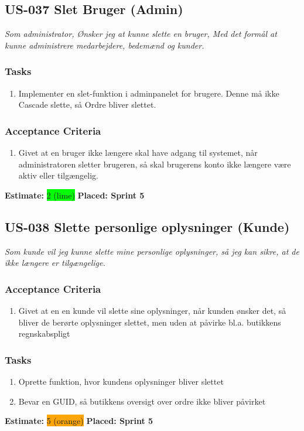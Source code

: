 \subsection{US-037 Slet Bruger (Admin)}
\label{sec:US-037}
\textit{Som administrator, Ønsker jeg at kunne slette en bruger, Med det formål at kunne administrere medarbejdere, bedemænd og kunder.}
\subsubsection*{\textbf{Tasks}}
\begin{enumerate}
  \item Implementer en slet-funktion i adminpanelet for brugere. Denne må ikke Cascade slette, så Ordre bliver slettet.
\end{enumerate}
\subsubsection*{\textbf{Acceptance Criteria}}
\begin{enumerate}
  \item Givet at en bruger ikke længere skal have adgang til systemet, når administratoren sletter brugeren, så skal brugerens konto ikke længere være aktiv eller tilgængelig.
\end{enumerate}
\textbf{Estimate:} \colorbox{lime}{2 (lime)}
\textbf{Placed: Sprint 5}
\par\noindent\dotfill

\subsection{US-038 Slette personlige oplysninger (Kunde)}
\label{sec:US-038}
\textit{Som kunde vil jeg kunne slette mine personlige oplysninger, så jeg kan sikre, at de ikke længere er tilgængelige.}
\subsubsection*{\textbf{Acceptance Criteria}}
\begin{enumerate}
  \item Givet at en en kunde vil slette sine oplysninger, når kunden ønsker det, så bliver de berørte oplysninger slettet, men uden at påvirke bl.a. butikkens regnskabspligt
\end{enumerate}
\subsubsection*{\textbf{Tasks}}
\begin{enumerate}
  \item Oprette funktion, hvor kundens oplysninger bliver slettet
  \item Bevar en GUID, så butikkens oversigt over ordre ikke bliver påvirket
\end{enumerate}
\textbf{Estimate:} \colorbox{orange}{5 (orange)}
\textbf{Placed: Sprint 5}
\par\noindent\dotfill

